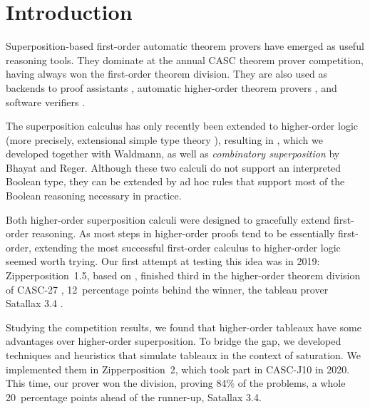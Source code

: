 \documentclass[smallcondensed,draft]{svjour3}     %
\begin{document}

\newcommand{\confrep}[2]{#2}

\section{Introduction}
\label{sec:ho-tech:intro}

Superposition-based first-order automatic theorem provers
have emerged as useful reasoning tools. They dominate at the annual CASC
\cite{gs-2016-casc} theorem prover competition, having always won the
first-order theorem division. They are also used as backends to proof assistants
\cite{ck-18-coqhammer,ku-15-holyhammer,pb-12-sh}, automatic
higher-order theorem provers \cite{sb-21-leo3}, and software verifiers
\cite{fp-13-why3}.

The superposition calculus has only recently been extended
to higher-order logic (more precisely, extensional simple type theory
\cite{henkin-1950-completeness}), resulting in
\emph{\lsup} \cite{bbtvw-21-sup-lam}, which we developed
together with Waldmann, as well as \emph{combinatory superposition}
\cite{br-20-full-sup-w-combs} by Bhayat and Reger. Although these two
calculi do not support an interpreted Boolean type,
they can be extended by ad hoc rules \cite{our-bool-paper} that support
most of the Boolean reasoning necessary in practice.

Both higher-order superposition calculi were designed to gracefully
extend first-order reasoning. As most steps in higher-order
proofs tend to be essentially first-order, extending the most successful first-order
calculus to higher-order logic seemed worth trying.
Our first attempt at testing this idea was in 2019:
Zipperposition~1.5, based on \lsup, finished third
in the higher-order theorem division of CASC-27 \cite{gs-19-casc27},
12~percentage points behind the winner, the tableau prover Satallax 3.4 \cite{cb-2013-satallax}.

Studying the competition results, we found that higher-order tableaux have
some advantages over higher-order superposition. To bridge the gap, we developed
techniques and heuristics that simulate tableaux in the
context of saturation. We implemented them in Zipperposition~2, which took part
in CASC-J10 \cite{gs-21-cascj10} in 2020. This time, our prover won the division, proving 84\% of
the problems, a whole 20~percentage points ahead of the runner-up, Satallax
3.4.
\end{document}
